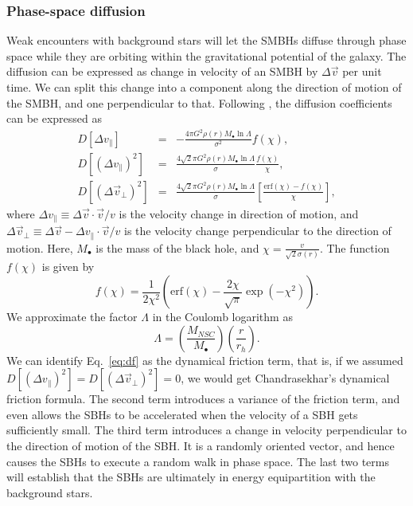 \documentclass[english, apj]{emulateapj}
\begin{document}
\subsubsection{Phase-space diffusion}
Weak encounters with background stars will let the SMBHs diffuse through phase space while they are orbiting within the gravitational potential of the galaxy. The diffusion can be expressed as change in velocity of an SMBH by $\Delta \vec{v}$ per unit time. We can split this change into a component along the direction of motion of the SMBH, and one perpendicular to that. Following \citet{Binney08}, the diffusion coefficients can be expressed as 
\begin{eqnarray}
D[\Delta v_\parallel] & = & -\frac{4\pi G^2\rho(r)M_\bullet\ln\Lambda}{\sigma^2}f(\chi),\label{eq:df}\\
D[(\Delta v_\parallel)^2] & = & \frac{4\sqrt{2}\pi G^2\rho(r)M_\bullet\ln\Lambda}{\sigma}\frac{f(\chi)}{\chi},\\
D[(\Delta \vec{v}_\bot)^2] & = & \frac{4\sqrt{2}\pi G^2\rho(r)M_\bullet\ln\Lambda}{\sigma}\left[\frac{\mbox{erf}(\chi)-f(\chi)}{\chi}\right],
\end{eqnarray} 
where $\Delta v_\parallel \equiv \Delta \vec{v}\cdot\vec{v}/v$ is the velocity change in direction of motion, and $\Delta \vec{v}_\bot \equiv \Delta \vec{v} - \Delta v_\parallel \cdot\vec{v}/v$ is the velocity change perpendicular to the direction of motion. Here, $M_\bullet$ is the mass of the black hole, and $\chi = \frac{v}{\sqrt{2}\sigma(r)}$. The function $f(\chi)$ is given by 
\begin{equation}
f(\chi) = \frac{1}{2\chi^2}\left(\mbox{erf}(\chi)-\frac{2\chi}{\sqrt{\pi}}\exp\left(-\chi^2\right)\right).
\end{equation}
We approximate the factor $\Lambda$ in the Coulomb logarithm as
\begin{equation}
\Lambda = \left(\frac{M_{NSC}}{M_\bullet}\right)\left(\frac{r}{r_h}\right).
\end{equation}
We can identify Eq.~\ref{eq:df} as the dynamical friction term, that is, if we assumed $D[(\Delta v_\parallel)^2]  = D[(\Delta \vec{v}_\bot)^2]  = 0$, we would get Chandrasekhar's dynamical friction formula. The second term introduces a variance of the friction term, and even allows the SBHs to be accelerated when the velocity of a SBH gets sufficiently small. The third term introduces a change in velocity perpendicular to the direction of motion of the SBH. It is a randomly oriented vector, and hence causes the SBHs to execute a random walk in phase space. The last two terms will establish that the SBHs are ultimately in energy equipartition with the background stars.
\end{document}
